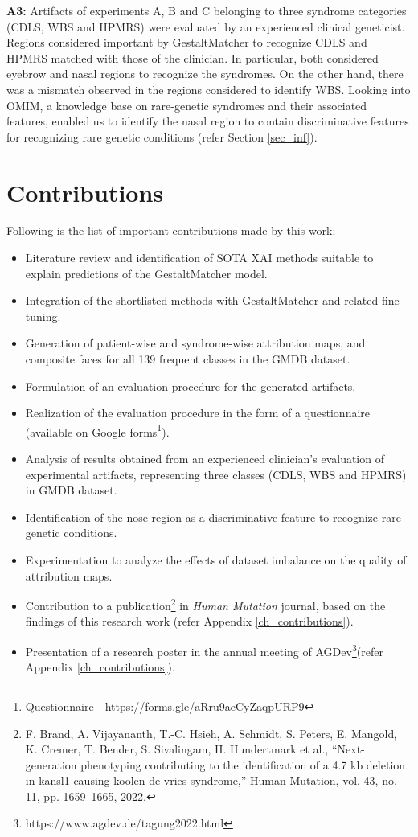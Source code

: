 \documentclass[../report.tex]{subfiles}
\begin{document}
	\textbf{A3:} Artifacts of experiments A, B and C belonging to three syndrome categories (CDLS, WBS and HPMRS) were evaluated by an experienced clinical geneticist. Regions considered important by GestaltMatcher to recognize CDLS and HPMRS matched with those of the clinician. In particular, both considered eyebrow and nasal regions to recognize the syndromes. On the other hand, there was a mismatch observed in the regions considered to identify WBS. Looking into OMIM, a knowledge base on rare-genetic syndromes and their associated features, enabled us to identify the nasal region to contain discriminative features for recognizing rare genetic conditions (refer Section \ref{sec_inf}).
	
    \section{Contributions}
	Following is the list of important contributions made by this work:
	\begin{itemize}
	\item Literature review and identification of SOTA XAI methods suitable to explain predictions of the GestaltMatcher model.
	\item Integration of the shortlisted methods with GestaltMatcher and related fine-tuning.
	\item Generation of patient-wise and syndrome-wise attribution maps, and composite faces for all 139 frequent classes in the GMDB dataset.
	\item Formulation of an evaluation procedure for the generated artifacts.
	\item Realization of the evaluation procedure in the form of a questionnaire (available on Google forms\footnote[1]{Questionnaire - \url{https://forms.gle/aRru9aeCyZaqpURP9}}).
	\item Analysis of results obtained from an experienced clinician's evaluation of experimental artifacts, representing three classes (CDLS, WBS and HPMRS) in GMDB dataset.
	\item Identification of the nose region as a discriminative feature to recognize rare genetic conditions.
	\item Experimentation to analyze the effects of dataset imbalance on the quality of attribution maps.
	\item Contribution to a publication\footnote[2]{F. Brand, A. Vijayananth, T.-C. Hsieh, A. Schmidt, S. Peters, E. Mangold, K. Cremer, T. Bender,
		S. Sivalingam, H. Hundertmark et al., “Next-generation phenotyping contributing to the identification
		of a 4.7 kb deletion in kansl1 causing koolen-de vries syndrome,” Human Mutation, vol. 43, no. 11,
		pp. 1659–1665, 2022.} in \textit{Human Mutation }journal, based on the findings of this research work (refer Appendix \ref{ch_contributions}).
	\item Presentation of a research poster in the annual meeting of AGDev\footnote[3]{https://www.agdev.de/tagung2022.html}(refer Appendix \ref{ch_contributions}).
	\end{itemize}
\end{document}

